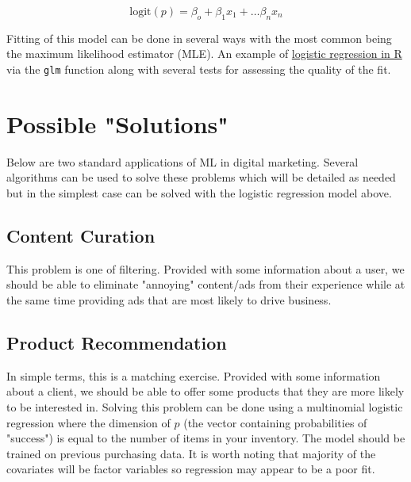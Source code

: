 \documentclass[12pt,a4paper]{article}
\newcommand{\logit}{\text{logit}}
\begin{document}
\begin{equation}
    \logit(p) = \beta_o + \beta_1 x_1 + \ldots \beta_n x_n
\end{equation}

Fitting of this model can be done in several ways with the most common being the maximum likelihood estimator (MLE). An example of \href{https://stats.idre.ucla.edu/r/dae/logit-regression/}{logistic regression in R} via the \texttt{glm} function along with several tests for assessing the quality of the fit. 

\section{Possible "Solutions"}

Below are two standard applications of ML in digital marketing. Several algorithms can be used to solve these problems which will be detailed as needed but in the simplest case can be solved with the logistic regression model above. 

\subsection{Content Curation}
This problem is one of filtering. Provided with some information about a user, we should be able to eliminate "annoying" content/ads from their experience while at the same time providing ads that are most likely to drive business. 

\subsection{Product Recommendation}
In simple terms, this is a matching exercise. Provided with some information about a client, we should be able to offer some products that they are more likely to be interested in. Solving this problem can be done using a multinomial logistic regression where the dimension of $p$ (the vector containing probabilities of "success") is equal to the number of items in your inventory. The model should be trained on previous purchasing data. It is worth noting that majority of the covariates will be factor variables so regression may appear to be a poor fit. 
\end{document}
